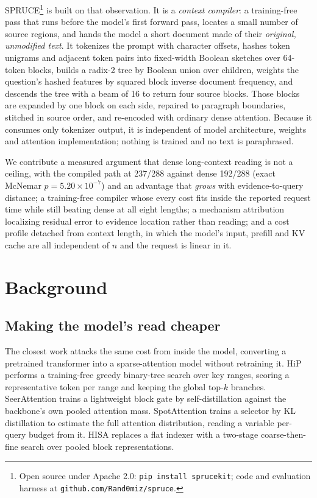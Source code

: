 \documentclass[conference]{IEEEtran}
\begin{document}
SPRUCE\footnote{Open
source under Apache 2.0: \texttt{pip install sprucekit}; code and evaluation harness
at \texttt{github.com/Rand0miz/spruce}.} is built on that
observation. It is a \emph{context compiler}: a training-free pass that runs before
the model's first forward pass, locates a small number of source regions, and hands
the model a short document made of their \emph{original, unmodified text}. It tokenizes the prompt with character
offsets, hashes token unigrams and adjacent token pairs into fixed-width Boolean
sketches over 64-token blocks, builds a radix-2 tree by Boolean union over children,
weights the question's hashed features by squared block inverse document frequency,
and descends the tree with a beam of 16 to return four source blocks. Those blocks
are expanded by one block on each side, repaired to paragraph boundaries, stitched
in source order, and re-encoded with ordinary dense attention. Because it consumes
only tokenizer output, it is independent of model architecture, weights and attention
implementation; nothing is trained and no text is paraphrased.

We contribute a measured argument that dense long-context reading is not a ceiling,
with the compiled path at 237/288 against dense 192/288 (exact McNemar
$p=5.20\times10^{-7}$) and an advantage that \emph{grows} with evidence-to-query
distance; a training-free compiler whose every cost fits inside the reported request
time while still beating dense at all eight lengths; a mechanism attribution
localizing residual error to evidence location rather than reading; and a cost
profile detached from context length, in which the model's input, prefill and KV
cache are all independent of $n$ and the request is linear in it.

\section{Background}

\subsection{Making the model's read cheaper}

The closest work attacks the same cost from inside the model, converting a
pretrained transformer into a sparse-attention model without retraining it. HiP
\cite{hip} performs a training-free greedy binary-tree search over key ranges,
scoring a representative token per range and keeping the global top-$k$ branches.
SeerAttention \cite{seer} trains a lightweight block gate by
self-distillation against the backbone's own pooled attention mass. SpotAttention
\cite{spot} trains a selector by KL distillation to estimate the full attention
distribution, reading a variable per-query budget from it. HISA \cite{hisa} replaces a flat indexer
with a two-stage coarse-then-fine search over pooled block representations.
\end{document}
